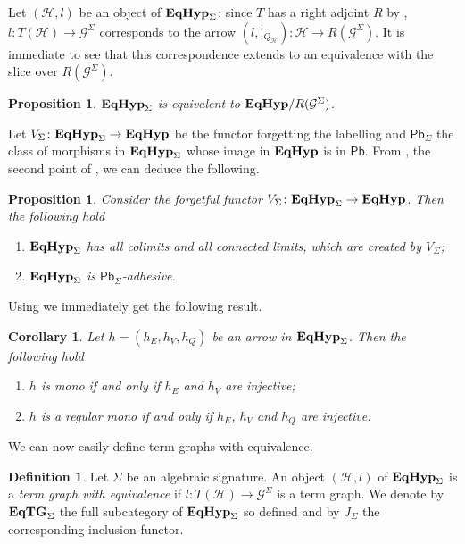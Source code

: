 \documentclass[a4paper,UKenglish,cleveref,pdftex,amsthm,thm-restate,numberwithinsect]{cas-sc}
\newcommand{\pbc}{\mathsf{Pb}}
\theoremstyle{plain}
\newtheorem{proposition}[theorem]{Proposition}
\newtheorem{corollary}[theorem]{Corollary}
\theoremstyle{definition}
\newtheorem{definition}[theorem]{Definition}
\newcommand{\catname}[1]{\textbf{\textup{#1}}}
\newcommand{\EqHyp}{\catname{EqHyp}} %
\newcommand{\EqTG}{\catname{EqTG}}
\begin{document}
Let $(\mathcal{H}, l)$ be an object of $\EqHyp_\Sigma$: since $T$ has a right adjoint $R$ by , $l\colon T(\mathcal{H})\to \mathcal{G}^\Sigma$ corresponds to the arrow $(l, !_{Q_{\mathcal{H}}})\colon \mathcal{H}\to R(\mathcal{G}^\Sigma)$. It is immediate to see that this correspondence extends to an equivalence with the slice over $R(\mathcal{G}^\Sigma)$.

\begin{proposition}\label{prop:slice}
$\EqHyp_\Sigma$ is equivalent to $\EqHyp/R(\mathcal{G}^\Sigma)$.
\end{proposition}

Let $V_\Sigma\colon \EqHyp_\Sigma\to \EqHyp$ be the functor forgetting the labelling and $\pbc_\Sigma$ the class of morphisms in $\EqHyp_\Sigma$ whose image in $\EqHyp$ is in $\pbc$. From , the second point of , we can deduce the following.

\begin{proposition}\label{prop:lim}Consider the forgetful functor $V_{\Sigma}\colon \EqHyp_\Sigma\to \EqHyp$. Then the following hold
	\begin{enumerate}
		\item $\EqHyp_\Sigma$ has all colimits and all connected limits, which are created by $V_{\Sigma}$;
		\item $\EqHyp_\Sigma$ is $\pbc_\Sigma$-adhesive.
	\end{enumerate}
\end{proposition}

Using  we immediately get the following result. 

\begin{corollary}\label{prop:monos_in_eqhyps} Let $h=(h_{E}, h_V, h_Q)$ be an arrow in $\EqHyp_\Sigma$. Then the following hold
	\begin{enumerate}
		\item $h$ is mono if and only if $h_E$ and $h_V$ are injective;
		\item $h$ is a regular mono if and only if $h_E$, $h_V$ and $h_Q$ are injective.
	\end{enumerate}
\end{corollary}


We can now easily define term graphs with equivalence.

\begin{definition}Let $\Sigma$ be an algebraic signature.
	An object $(\mathcal{H}, l)$ of $\EqHyp_\Sigma$ is a \emph{term graph with equivalence} if $l\colon T(\mathcal{H})\to \mathcal{G}^\Sigma$ is a term graph. We denote by $\EqTG_{\Sigma}$ the full subcategory of $\EqHyp_\Sigma$ so defined and by $J_{\Sigma}$ the corresponding inclusion functor.
 \end{definition}
\end{document}
